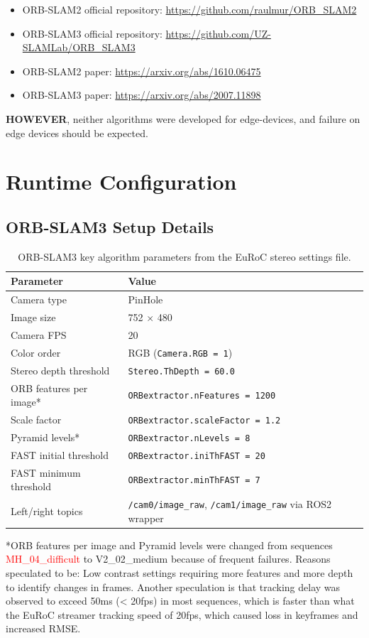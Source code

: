 \documentclass[11pt]{article}
\begin{document}
\begin{itemize}
    \item ORB-SLAM2 official repository: \url{https://github.com/raulmur/ORB_SLAM2}
    \item ORB-SLAM3 official repository: \url{https://github.com/UZ-SLAMLab/ORB_SLAM3}
    \item ORB-SLAM2 paper: \url{https://arxiv.org/abs/1610.06475}
    \item ORB-SLAM3 paper: \url{https://arxiv.org/abs/2007.11898}
\end{itemize}
\textbf{HOWEVER}, neither algorithms were developed for edge-devices, and failure on edge devices should be expected.
\section{Runtime Configuration}

\subsection{ORB-SLAM3 Setup Details}


\begin{table}[H]
\centering
\small
\caption{ORB-SLAM3 key algorithm parameters from the EuRoC stereo settings file.}
\label{tab:orb_algorithm_params}
\begin{tabular}{lp{9.5cm}}
\toprule
Parameter & Value \\
\midrule
Camera type & PinHole \\
Image size & 752 $\times$ 480 \\
Camera FPS & 20 \\
Color order & RGB (\texttt{Camera.RGB = 1}) \\
Stereo depth threshold & \texttt{Stereo.ThDepth = 60.0} \\
ORB features per image* & \texttt{ORBextractor.nFeatures = 1200} \\
Scale factor & \texttt{ORBextractor.scaleFactor = 1.2} \\
Pyramid levels* & \texttt{ORBextractor.nLevels = 8} \\
FAST initial threshold & \texttt{ORBextractor.iniThFAST = 20} \\
FAST minimum threshold & \texttt{ORBextractor.minThFAST = 7} \\
Left/right topics & \texttt{/cam0/image\_raw}, \texttt{/cam1/image\_raw} via ROS2 wrapper \\
\bottomrule
\end{tabular}
\end{table}
*ORB features per image and Pyramid levels were changed from sequences \textcolor{red}{MH\_04\_difficult} to V2\_02\_medium because of frequent failures. Reasons speculated to be: Low contrast settings requiring more features and more depth to identify changes in frames. Another speculation is that tracking delay was observed to exceed 50ms (< 20fps) in most sequences, which is faster than what the EuRoC streamer tracking speed of 20fps, which caused loss in keyframes and increased RMSE.
\end{document}
